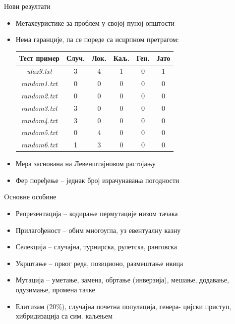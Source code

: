 \documentclass{beamer}
\begin{document}
\begin{frame}{Нови резултати}
\begin{itemize}
\item Метахеуристике за проблем у својој пуној општости

\item Нема гаранције, па се пореде са исцрпном претрагом:
\begin{center}
\begin{tabular}{| c | c c c c c |} \hline
Тест пример & Случ. & Лок. & Каљ. & Ген. & Јато\\ \hline
\textit{ulaz9.txt} & 3 & 4 & 1 & 0 & 1\\
\textit{random1.txt} & 0 & 0 & 0 & 0 & 0\\
\textit{random2.txt} & 0 & 0 & 0 & 0 & 0\\
\textit{random3.txt} & 3 & 0 & 0 & 0 & 0\\
\textit{random4.txt} & 3 & 0 & 0 & 0 & 0\\
\textit{random5.txt} & 0 & 4 & 0 & 0 & 0\\
\textit{random6.txt} & 1 & 3 & 0 & 0 & 0\\ \hline
\end{tabular}
\end{center}

\item Мера заснована на Левенштајновом растојању

\item Фер поређење -- једнак број израчунавања погодности
\end{itemize}
\end{frame}

\begin{frame}
\end{frame}

\begin{frame}{Oсновне особине}
\begin{itemize}
\item Репрезентација -- кодирање пермутације низом тачака

\item Прилагођеност -- обим многоугла, уз евентуалну казну

\item Селекција -- случајна, турнирска, рулетска, ранговска

\item Укрштање -- првог реда, позиционо, размештање ивица

\item Мутација -- уметање, замена, обртање (инверзија), мешање, додавање, одузимање, промена тачке

\item Елитизам (20\%), случајна почетна популација, генера- цијски приступ, хибридизација са сим. каљењем
\end{itemize}
\end{frame}
\end{document}
